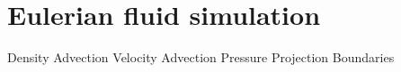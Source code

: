 \section{Eulerian fluid simulation}
	Density Advection
	Velocity Advection
	Pressure Projection
	Boundaries